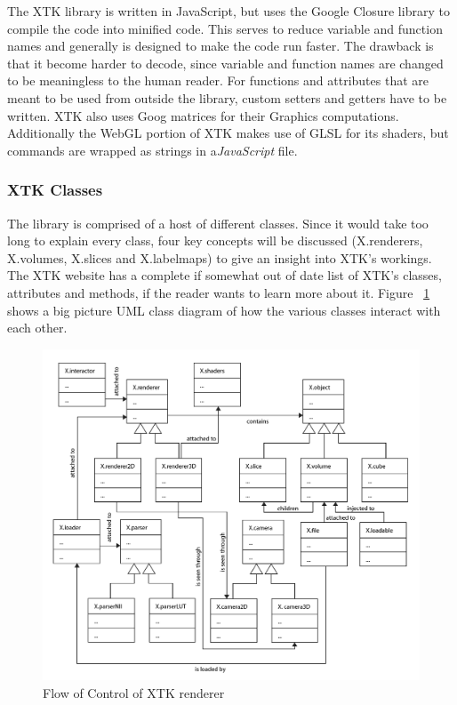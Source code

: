 \documentclass[a4paper,11pt,twoside]{article}
\begin{document}
The XTK library is written in JavaScript, but uses the Google Closure library to compile the code into minified code. This serves to reduce variable and function names and generally is designed to make the code run faster. The drawback is that it become harder to decode, since variable and function names are changed to be meaningless to the human reader. For functions and attributes that are meant to be used from outside the library, custom setters and getters have to be written. XTK also uses Goog matrices for their Graphics computations. Additionally the WebGL portion of XTK makes use of GLSL for its shaders, but commands are wrapped as strings in a\textit{JavaScript} file.

\subsubsection{XTK Classes}

The library is comprised of a host of different classes. Since it would take too long to explain every class, four key concepts will be discussed (X.renderers, X.volumes, X.slices and X.labelmaps) to give an insight into XTK's workings. The XTK website has a complete if somewhat out of date list of XTK's classes, attributes and methods, if the reader wants to learn more about it. Figure ~\ref{fig:xtkBig} shows a big picture UML class diagram of how the various classes interact with each other.


\begin{figure}[ht!]
\centering
\includegraphics[width=170mm]{graphics/xtkUML_big_01.png}
\caption{Flow of Control of XTK renderer}
\label{fig:xtkBig}
\end{figure}
\end{document}
